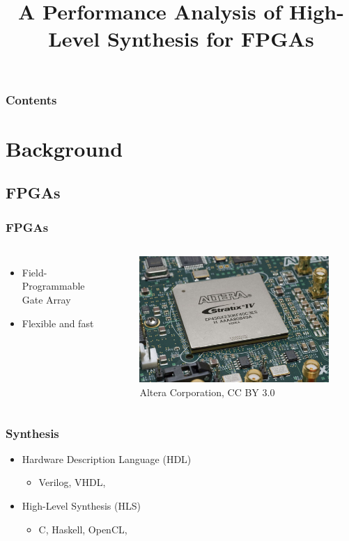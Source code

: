 \documentclass[aspectratio=1610]{uva-inf-presentation}
\title{A Performance Analysis of High-Level Synthesis for FPGAs}
\begin{document}
\begin{titelframe}
\titlepage
\end{titelframe}

\begin{frame}
\frametitle{Contents}
\tableofcontents
\end{frame}

\section{Background}

\subsection{FPGAs}

\begin{frame}
  \frametitle{FPGAs}
  \begin{columns}[c]
    \begin{itemize}
      \item Field-Programmable Gate Array
      \item Flexible and fast
    \end{itemize}
    \begin{figure}
      \includegraphics[width=1\linewidth]{fpga}
      \caption{Altera Corporation, CC BY 3.0}
    \end{figure}
  \end{columns}
\end{frame}

\begin{frame}
  \frametitle{Synthesis}
  \begin{itemize}
    \item Hardware Description Language (HDL)
      \begin{itemize}
        \item Verilog, VHDL, \textellipsis
      \end{itemize}
    \item High-Level Synthesis (HLS)
      \begin{itemize}
        \item C, Haskell, OpenCL, \textellipsis
      \end{itemize}
  \end{itemize}
\end{frame}
\end{document}
